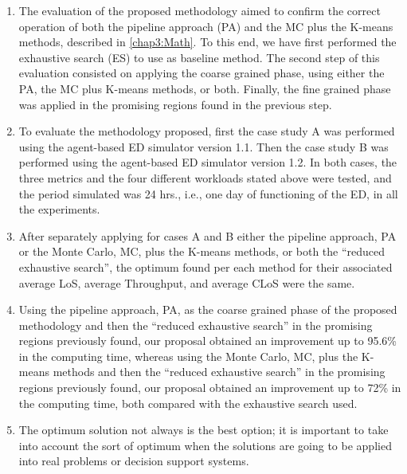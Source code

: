 \begin{enumerate}
\item The evaluation of the proposed methodology aimed to confirm the correct
operation of both the pipeline approach (PA) and the MC plus the K-means
methods, described in \ref{chap3:Math}. To this end, we have first
performed the exhaustive search (ES) to use as baseline method. The
second step of this evaluation consisted on applying the coarse grained
phase, using either the PA, the MC plus K-means methods, or both.
Finally, the fine grained phase was applied in the promising regions
found in the previous step.\\

\item To evaluate the methodology proposed, first the case study A was performed
using the agent-based ED simulator version 1.1. Then the case study
B was performed using the agent-based ED simulator version 1.2. In
both cases, the three metrics and the four different workloads stated
above were tested, and the period simulated was 24 hrs., i.e., one
day of functioning of the ED, in all the experiments.\\

\item After separately applying for cases A and B either the pipeline approach,
PA or the Monte Carlo, MC, plus the K-means methods, or both the \textquotedblleft{}reduced
exhaustive search\textquotedblright{}, the optimum found per each
method for their associated average LoS, average Throughput, and average
CLoS were the same.\\

\item Using the pipeline approach, PA, as the coarse grained phase of the
proposed methodology and then the \textquotedblleft{}reduced exhaustive
search\textquotedblright{} in the promising regions previously found,
our proposal obtained an improvement up to 95.6\% in the computing
time, whereas using the Monte Carlo, MC, plus the K-means methods
and then the \textquotedblleft{}reduced exhaustive search\textquotedblright{}
in the promising regions previously found, our proposal obtained an
improvement up to 72\% in the computing time, both compared with the
exhaustive search used.
\item The optimum solution not always is the best option; it is important
to take into account the sort of optimum when the solutions are going
to be applied into real problems or decision support systems.
\end{enumerate}


